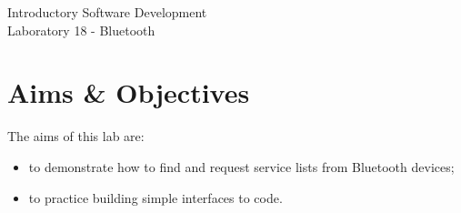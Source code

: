 \documentclass[12pt,oneside]{cttutorial}
\begin{document}
\tutorialextra{}


 

\newcommand{\xkcd}[2]{
	\begin{center}
	\texttt{[image: ../../Figures/png/\#1]}
	\newline
	\url{http://xkcd.com/#2}
	\end{center}
	\bigskip
}

\newcommand{\alert}[1]
{\marginpar
  {\makebox[0 pt][l]
    {\texttt{[image: ../../Figures/png/warning.png]}
  }
  \parbox{2 cm}{{\sffamily \bfseries \tiny #1}}}}


\renewcommand{\baselinestretch}{1.5}
\textwidth=15cm

\newcommand{\I}{j}

\begin{center}
\begin{bfseries}
Introductory Software Development\\Laboratory 18 - Bluetooth
\end{bfseries}
\end{center}

\section{Aims \& Objectives}

The aims of this lab are:

\begin{itemize}
\item to demonstrate how to find and request service lists from Bluetooth devices;
\item to practice building simple interfaces to code.
\end{itemize}
\end{document}
